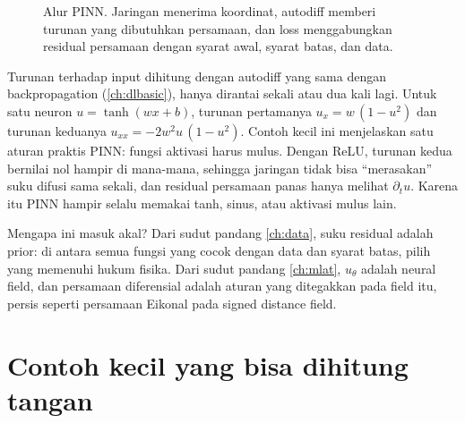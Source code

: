 \begin{figure}[ht]
\centering
{}
\caption{Alur PINN. Jaringan menerima koordinat, autodiff memberi turunan yang dibutuhkan persamaan, dan loss
menggabungkan residual persamaan dengan syarat awal, syarat batas, dan data.}
\label{fig:pinn}
\end{figure}

Turunan terhadap input dihitung dengan autodiff yang sama dengan backpropagation (\cref{ch:dlbasic}), hanya
dirantai sekali atau dua kali lagi. Untuk satu neuron $u=\tanh(wx+b)$, turunan pertamanya
$u_x=w\,(1-u^2)$ dan turunan keduanya $u_{xx}=-2w^2u\,(1-u^2)$. Contoh kecil ini menjelaskan satu aturan praktis
PINN: fungsi aktivasi harus mulus. Dengan ReLU, turunan kedua bernilai nol hampir di mana-mana, sehingga
jaringan tidak bisa ``merasakan'' suku difusi sama sekali, dan residual persamaan panas hanya melihat
$\partial_tu$. Karena itu PINN hampir selalu memakai tanh, sinus, atau aktivasi mulus lain.

Mengapa ini masuk akal? Dari sudut pandang \cref{ch:data}, suku residual adalah prior: di antara semua
fungsi yang cocok dengan data dan syarat batas, pilih yang memenuhi hukum fisika. Dari sudut pandang
\cref{ch:mlat}, $u_\theta$ adalah neural field, dan persamaan diferensial adalah aturan yang ditegakkan
pada field itu, persis seperti persamaan Eikonal pada signed distance field.

\section{Contoh kecil yang bisa dihitung tangan}

